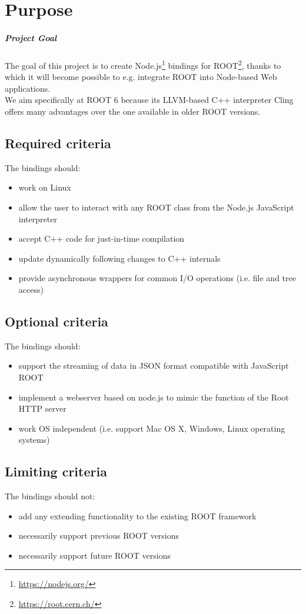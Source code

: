 \chapter{Purpose}
\paragraph{Project Goal}
The goal of this project is to create Node.js\textsuperscript{\textregistered}\footnote{\url{https://nodejs.org/}} bindings for
ROOT\footnote{\url{https://root.cern.ch/}}, thanks to which it will become possible to e.g. integrate ROOT into Node-based Web applications.\\
We aim specifically at ROOT 6 because its LLVM-based C++ interpreter Cling offers many advantages over the one available in older ROOT versions.
\section{Required criteria}
The bindings should:
\begin{itemize}
	\item work on Linux
	\item allow the user to interact with any ROOT class from the Node.js JavaScript interpreter
	\item accept C++ code for just-in-time compilation
	\item update dynamically following changes to C++ internals
	\item provide asynchronous wrappers for common I/O operations (i.e. file and tree access)
\end{itemize}
\pagebreak[3]

\section{Optional criteria}
The bindings should:
\begin{itemize}
	\item support the streaming of data in JSON format compatible with JavaScript ROOT
	\item implement a webserver based on node.js to mimic the function of the Root HTTP server
	\item work OS independent (i.e. support Mac OS X, Windows, Linux operating systems)
\end{itemize}

\section{Limiting criteria}
The bindings should not:
\begin{itemize}
	\item add any extending functionality to the existing ROOT framework
	\item necessarily support previous ROOT versions
	\item necessarily support future ROOT versions
\end{itemize}
